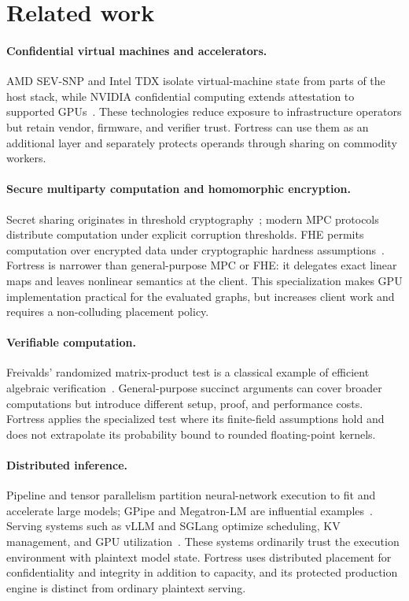 \section{Related work}\label{sec:related}

\paragraph{Confidential virtual machines and accelerators.}
AMD SEV-SNP and Intel TDX isolate virtual-machine state from parts of the host stack, while NVIDIA confidential computing extends attestation to supported GPUs~\cite{amd-sev-snp,intel-tdx,nvidia-cc}. These technologies reduce exposure to infrastructure operators but retain vendor, firmware, and verifier trust. Fortress can use them as an additional layer and separately protects operands through sharing on commodity workers.

\paragraph{Secure multiparty computation and homomorphic encryption.}
Secret sharing originates in threshold cryptography~\cite{shamir1979}; modern MPC protocols distribute computation under explicit corruption thresholds. FHE permits computation over encrypted data under cryptographic hardness assumptions~\cite{gentry2009}. Fortress is narrower than general-purpose MPC or FHE: it delegates exact linear maps and leaves nonlinear semantics at the client. This specialization makes GPU implementation practical for the evaluated graphs, but increases client work and requires a non-colluding placement policy.

\paragraph{Verifiable computation.}
Freivalds' randomized matrix-product test is a classical example of efficient algebraic verification~\cite{freivalds1977}. General-purpose succinct arguments can cover broader computations but introduce different setup, proof, and performance costs. Fortress applies the specialized test where its finite-field assumptions hold and does not extrapolate its probability bound to rounded floating-point kernels.

\paragraph{Distributed inference.}
Pipeline and tensor parallelism partition neural-network execution to fit and accelerate large models; GPipe and Megatron-LM are influential examples~\cite{gpipe,megatron}. Serving systems such as vLLM and SGLang optimize scheduling, KV management, and GPU utilization~\cite{vllm,sglang}. These systems ordinarily trust the execution environment with plaintext model state. Fortress uses distributed placement for confidentiality and integrity in addition to capacity, and its protected production engine is distinct from ordinary plaintext serving.


